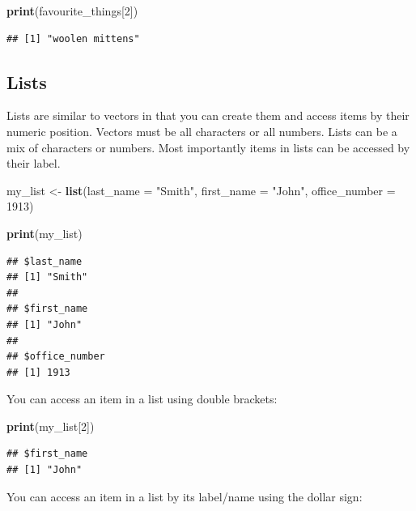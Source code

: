 \documentclass[
]{krantz}
\makeatletter
\newenvironment{Shaded}{\begin{snugshade}}{\end{snugshade}}
\newcommand{\DataTypeTok}[1]{\textcolor[rgb]{0.27,0.27,0.27}{#1}}
\newcommand{\DecValTok}[1]{\textcolor[rgb]{0.06,0.06,0.06}{#1}}
\newcommand{\KeywordTok}[1]{\textcolor[rgb]{0.27,0.27,0.27}{\textbf{#1}}}
\newcommand{\NormalTok}[1]{#1}
\newcommand{\StringTok}[1]{\textcolor[rgb]{0.5,0.5,0.5}{#1}}
\newenvironment{kframe}{%
\medskip{}
\setlength{\fboxsep}{.8em}
 \def\at@end@of@kframe{}%
 \ifinner\ifhmode%
  \def\at@end@of@kframe{\end{minipage}}%
  \begin{minipage}{\columnwidth}%
 \fi\fi%
 \def\FrameCommand##1{\hskip\@totalleftmargin \hskip-\fboxsep
 \colorbox{shadecolor}{##1}\hskip-\fboxsep
     \hskip-\linewidth \hskip-\@totalleftmargin \hskip\columnwidth}%
 \MakeFramed {\advance\hsize-\width
   \@totalleftmargin\z@ \linewidth\hsize
   \@setminipage}}%
 {\par\unskip\endMakeFramed%
 \at@end@of@kframe}
\renewenvironment{Shaded}{\begin{kframe}}{\end{kframe}}
\makeatother
\begin{document}
\begin{Shaded}
\begin{Highlighting}[]
\KeywordTok{print}\NormalTok{(favourite_things[}\DecValTok{2}\NormalTok{])}
\end{Highlighting}
\end{Shaded}

\begin{verbatim}
## [1] "woolen mittens"
\end{verbatim}

\hypertarget{lists}{%
\subsection{Lists}\label{lists}}

Lists are similar to vectors in that you can create them and access items by their numeric position. Vectors must be all characters or all numbers. Lists can be a mix of characters or numbers. Most importantly items in lists can be accessed by their label.

\begin{Shaded}
\begin{Highlighting}[]
\NormalTok{my_list <-}\StringTok{ }\KeywordTok{list}\NormalTok{(}\DataTypeTok{last_name =} \StringTok{"Smith"}\NormalTok{,}
                \DataTypeTok{first_name =} \StringTok{"John"}\NormalTok{,}
                \DataTypeTok{office_number =} \DecValTok{1913}\NormalTok{)}

\KeywordTok{print}\NormalTok{(my_list)}
\end{Highlighting}
\end{Shaded}

\begin{verbatim}
## $last_name
## [1] "Smith"
## 
## $first_name
## [1] "John"
## 
## $office_number
## [1] 1913
\end{verbatim}

You can access an item in a list using double brackets:

\begin{Shaded}
\begin{Highlighting}[]
\KeywordTok{print}\NormalTok{(my_list[}\DecValTok{2}\NormalTok{])}
\end{Highlighting}
\end{Shaded}

\begin{verbatim}
## $first_name
## [1] "John"
\end{verbatim}

You can access an item in a list by its label/name using the dollar sign:
\end{document}
